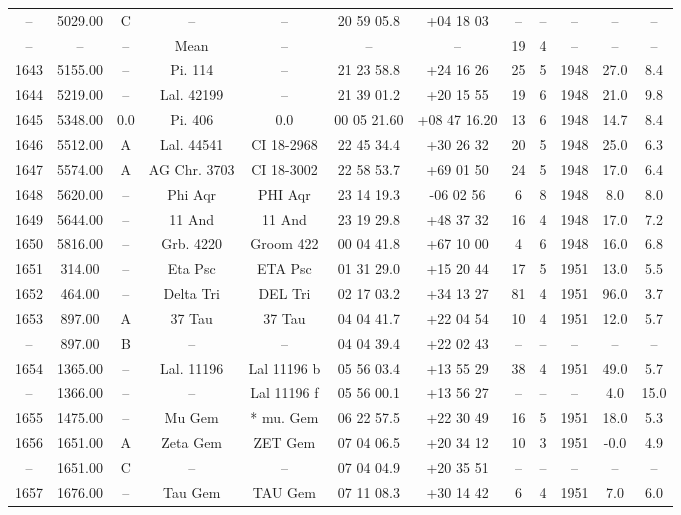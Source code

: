 \begin{table}
\begin{tabular}{cccccccccccc}
-- & 5029.00 & C & -- & -- & 20 59 05.8 & +04 18 03 & -- & -- & -- & -- & -- \\
-- & -- & -- & Mean & -- & -- & -- & 19 & 4 & -- & -- & -- \\
1643 & 5155.00 & -- & Pi. 114 & -- & 21 23 58.8 & +24 16 26 & 25 & 5 & 1948 & 27.0 & 8.4 \\
1644 & 5219.00 & -- & Lal. 42199 & -- & 21 39 01.2 & +20 15 55 & 19 & 6 & 1948 & 21.0 & 9.8 \\
1645 & 5348.00 & 0.0 & Pi. 406 & 0.0 & 00 05 21.60 & +08 47 16.20 & 13 & 6 & 1948 & 14.7 & 8.4 \\
1646 & 5512.00 & A & Lal. 44541 & CI 18-2968 & 22 45 34.4 & +30 26 32 & 20 & 5 & 1948 & 25.0 & 6.3 \\
1647 & 5574.00 & A & AG Chr. 3703 & CI 18-3002 & 22 58 53.7 & +69 01 50 & 24 & 5 & 1948 & 17.0 & 6.4 \\
1648 & 5620.00 & -- & Phi Aqr & PHI Aqr & 23 14 19.3 & -06 02 56 & 6 & 8 & 1948 & 8.0 & 8.0 \\
1649 & 5644.00 & -- & 11 And & 11 And & 23 19 29.8 & +48 37 32 & 16 & 4 & 1948 & 17.0 & 7.2 \\
1650 & 5816.00 & -- & Grb. 4220 & Groom 422 & 00 04 41.8 & +67 10 00 & 4 & 6 & 1948 & 16.0 & 6.8 \\
1651 & 314.00 & -- & Eta Psc & ETA Psc & 01 31 29.0 & +15 20 44 & 17 & 5 & 1951 & 13.0 & 5.5 \\
1652 & 464.00 & -- & Delta Tri & DEL Tri & 02 17 03.2 & +34 13 27 & 81 & 4 & 1951 & 96.0 & 3.7 \\
1653 & 897.00 & A & 37 Tau & 37 Tau & 04 04 41.7 & +22 04 54 & 10 & 4 & 1951 & 12.0 & 5.7 \\
-- & 897.00 & B & -- & -- & 04 04 39.4 & +22 02 43 & -- & -- & -- & -- & -- \\
1654 & 1365.00 & -- & Lal. 11196 & Lal 11196 b & 05 56 03.4 & +13 55 29 & 38 & 4 & 1951 & 49.0 & 5.7 \\
-- & 1366.00 & -- & -- & Lal 11196 f & 05 56 00.1 & +13 56 27 & -- & -- & -- & 4.0 & 15.0 \\
1655 & 1475.00 & -- & Mu Gem & * mu. Gem & 06 22 57.5 & +22 30 49 & 16 & 5 & 1951 & 18.0 & 5.3 \\
1656 & 1651.00 & A & Zeta Gem & ZET Gem & 07 04 06.5 & +20 34 12 & 10 & 3 & 1951 & -0.0 & 4.9 \\
-- & 1651.00 & C & -- & -- & 07 04 04.9 & +20 35 51 & -- & -- & -- & -- & -- \\
1657 & 1676.00 & -- & Tau Gem & TAU Gem & 07 11 08.3 & +30 14 42 & 6 & 4 & 1951 & 7.0 & 6.0 \\

\end{tabular}
\end{table}
